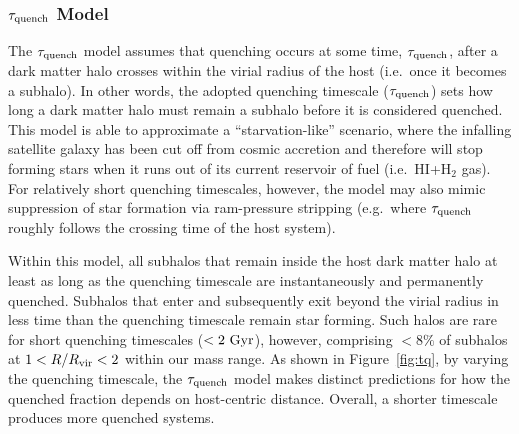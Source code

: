 \documentclass[usenatbib]{mnras}
\newcommand{\rvir}{R_{\rm vir}}
\begin{document}
\subsubsection{$\tau_{\rm quench}$ Model}
\label{subsubsec:starve}

The $\tau_{\rm quench}$ model assumes that quenching occurs at some time,
$\tau_{\rm quench}$, after a dark matter halo crosses within the virial radius of
the host (i.e.~once it becomes a subhalo).
%
In other words, the adopted quenching timescale ($\tau_{\rm quench}$) sets how
long a dark matter halo must remain a subhalo before it is considered quenched.
% 
This model is able to approximate a ``starvation-like'' scenario,
where the infalling satellite galaxy has been cut off from cosmic
accretion and therefore will stop forming stars when it runs out of
its current reservoir of fuel (i.e.~H{\scriptsize I}+H$_{2}$ gas). 
%
For relatively short quenching timescales, however, the model may also
mimic suppression of star formation via ram-pressure stripping
(e.g.~where $\tau_{\rm quench}$ roughly follows the crossing time of
the host system). 





Within this model, all subhalos that remain inside the host dark matter halo at
least as long as the quenching timescale are instantaneously and permanently
quenched.
%
Subhalos that enter and subsequently exit beyond the virial radius in less time
than the quenching timescale remain star forming.
%
Such halos are rare for short quenching timescales ($<2~{\rm Gyr}$),
however, comprising $<8\%$ of subhalos at $1<R/\rvir<2$ within our
mass range. 
%
As shown in Figure~\ref{fig:tq}, by varying the quenching timescale, the
$\tau_{\rm quench}$ model makes distinct predictions for how the
quenched fraction depends on host-centric distance. Overall, a shorter
timescale produces more quenched systems.
\end{document}
